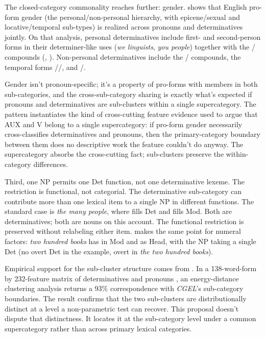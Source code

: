 \documentclass[12pt]{article}
\begin{document}
The closed-category commonality reaches further: gender. \textcite{reynolds2026gender} shows that English pro-form gender (the personal/non-personal hierarchy, with epicene/sexual and locative/temporal sub-types) is realized across pronouns and determinatives jointly. On that analysis, personal determinatives include first- and second-person forms in their determiner-like uses (\textit{we linguists}, \textit{you people}) together with the / compounds (, ). Non-personal determinatives include the / compounds, the temporal forms //, and /.

Gender isn't pronoun-specific; it's a property of pro-forms with members in both sub-categories, and the cross-sub-category sharing is exactly what's expected if pronouns and determinatives are sub-clusters within a single supercategory. The pattern instantiates the kind of cross-cutting feature evidence \textcite[§1.2]{pullumwilson1977} used to argue that AUX and V belong to a single supercategory: if pro-form gender necessarily cross-classifies determinatives and pronouns, then the primary-category boundary between them does no descriptive work the feature couldn't do anyway. The supercategory absorbs the cross-cutting fact; sub-clusters preserve the within-category differences.

Third, one NP permits one Det function, not one determinative lexeme. The restriction is functional, not categorial. The determinative sub-category can contribute more than one lexical item to a single NP in different functions. The standard case is \textit{the many people}, where  fills Det and  fills Mod. Both are determinatives; both are nouns on this account. The functional restriction is preserved without relabeling either item. \textcite{reynolds2026numerals} makes the same point for numeral factors: \textit{two hundred books} has  in Mod and  as Head, with the NP taking a single Det (no overt Det in the example, overt in \textit{the two hundred books}).

Empirical support for the sub-cluster structure comes from \textcite{reynolds2021}. In a 138-word-form by 232-feature matrix of determinatives and pronouns \citep{reynolds2021matrix}, an energy-distance clustering analysis returns a 93\% correspondence with \textit{CGEL}'s sub-category boundaries. The result confirms that the two sub-clusters are distributionally distinct at a level a non-parametric test can recover. This proposal doesn't dispute that distinctness. It locates it at the sub-category level under a common supercategory rather than across primary lexical categories.
\end{document}
